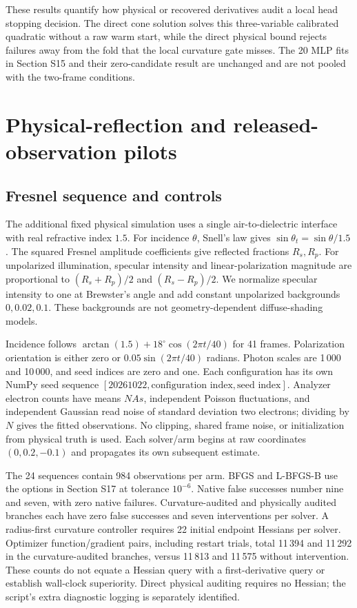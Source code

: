 These results quantify how physical or recovered derivatives audit a local head stopping decision. The direct cone solution solves this three-variable calibrated quadratic without a raw warm start, while the direct physical bound rejects failures away from the fold that the local curvature gate misses. The 20 MLP fits in Section S15 and their zero-candidate result are unchanged and are not pooled with the two-frame conditions.

\section{Physical-reflection and released-observation pilots}
\label{SI-sec:realprotocol}
\subsection{Fresnel sequence and controls}
The additional fixed physical simulation uses a single air-to-dielectric interface with real refractive index $1.5$. For incidence $\theta$, Snell's law gives $\sin\theta_t=\sin\theta/1.5$. The squared Fresnel amplitude coefficients give reflected fractions $R_s,R_p$. For unpolarized illumination, specular intensity and linear-polarization magnitude are proportional to $(R_s+R_p)/2$ and $(R_s-R_p)/2$. We normalize specular intensity to one at Brewster's angle and add constant unpolarized backgrounds $0,0.02,0.1$. These backgrounds are not geometry-dependent diffuse-shading models.

Incidence follows $\arctan(1.5)+18^{\circ}\cos(2\pi t/40)$ for 41 frames. Polarization orientation is either zero or $0.05\sin(2\pi t/40)$ radians. Photon scales are 1\,000 and 10\,000, and seed indices are zero and one. Each configuration has its own NumPy seed sequence $[20261022,\text{configuration index},\text{seed index}]$. Analyzer electron counts have means $NAs$, independent Poisson fluctuations, and independent Gaussian read noise of standard deviation two electrons; dividing by $N$ gives the fitted observations. No clipping, shared frame noise, or initialization from physical truth is used. Each solver/arm begins at raw coordinates $(0,0.2,-0.1)$ and propagates its own subsequent estimate.

The 24 sequences contain 984 observations per arm. BFGS and L-BFGS-B use the options in Section S17 at tolerance $10^{-6}$. Native false successes number nine and seven, with zero native failures. Curvature-audited and physically audited branches each have zero false successes and seven interventions per solver. A radius-first curvature controller requires 22 initial endpoint Hessians per solver. Optimizer function/gradient pairs, including restart trials, total 11\,394 and 11\,292 in the curvature-audited branches, versus 11\,813 and 11\,575 without intervention. These counts do not equate a Hessian query with a first-derivative query or establish wall-clock superiority. Direct physical auditing requires no Hessian; the script's extra diagnostic logging is separately identified.

